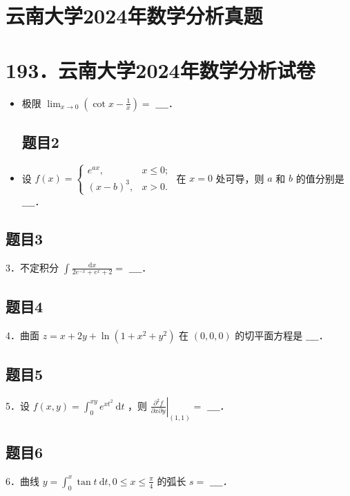 \documentclass{article}
\begin{document}
\section*{云南大学2024年数学分析真题}
\section*{193．云南大学2024年数学分析试卷}
\begin{itemize}

\subsection{题目1}
  \item[1．] 极限 \(\lim _{x \rightarrow 0}\left(\cot x-\frac{1}{x}\right)=\) \(\_\_\_\_\)．

\subsection{题目2}
  \item[2．] 设 \(f(x)=\left\{\begin{array}{ll}e^{a x}, & x \leq 0 ; \\ (x-b)^{3}, & x>0 .\end{array}\right.\) 在 \(x=0\) 处可导，则 \(a\) 和 \(b\) 的值分别是 \(\_\_\_\_\)．
\end{itemize}

\subsection{题目3}
3．不定积分 \(\int \frac{\mathrm{d} x}{2 e^{-x}+e^{x}+2}=\) \(\_\_\_\_\)．

\subsection{题目4}
4．曲面 \(z=x+2 y+\ln \left(1+x^{2}+y^{2}\right)\) 在 \((0,0,0)\) 的切平面方程是 \(\_\_\_\_\)．

\subsection{题目5}
5．设 \(f(x, y)=\int_{0}^{x y} e^{x t^{2}} \mathrm{~d} t\) ，则 \(\left.\frac{\partial^{2} f}{\partial x \partial y}\right|_{(1,1)}=\) \(\_\_\_\_\)．

\subsection{题目6}
6．曲线 \(y=\int_{0}^{x} \tan t \mathrm{~d} t, 0 \leq x \leq \frac{\pi}{4}\) 的弧长 \(s=\) \(\_\_\_\_\)．
\end{document}
